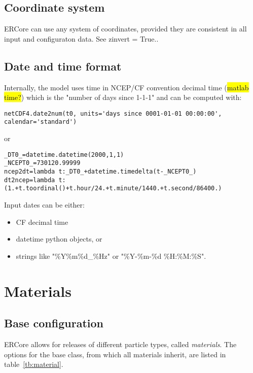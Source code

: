 \documentclass[a4paper]{article}
\begin{document}
\subsection{Coordinate system}
\label{ssec:coords}

ERCore can use any system of coordinates, provided they are consistent in all input and configuraton data. See zinvert = True..


\subsection{Date and time format}
\label{ssec:datetime}

Internally, the model uses time in NCEP/CF convention decimal time (\hl{matlab time?}) which is the "number of days since 1-1-1"  and can be computed with:

\begin{Verbatim}[fontsize=\small]
netCDF4.date2num(t0, units='days since 0001-01-01 00:00:00', calendar='standard') 
\end{Verbatim}

or 

\begin{Verbatim}[fontsize=\small]
_DT0_=datetime.datetime(2000,1,1)
_NCEPT0_=730120.99999
ncep2dt=lambda t:_DT0_+datetime.timedelta(t-_NCEPT0_)
dt2ncep=lambda t: (1.+t.toordinal()+t.hour/24.+t.minute/1440.+t.second/86400.)
\end{Verbatim}


Input dates can be either:

\begin{itemize} 
\item CF decimal time
\item datetime python objects, or 
\item strings like "\%Y\%m\%d\_\%Hz" or "\%Y-\%m-\%d \%H:\%M:\%S".
\end{itemize} 



\section{Materials}
\label{sec:materials}

\subsection{Base configuration}

ERCore allows for releases of different particle types, called \textit{materials}. The options for the base class, from which all materials inherit, are listed in table~\ref{tb:material}. 
\end{document}

